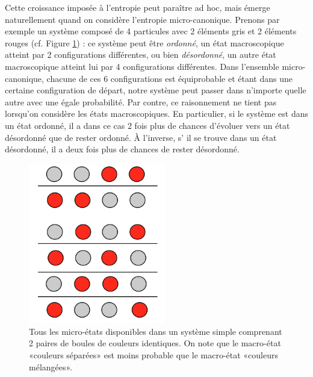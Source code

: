 Cette croissance imposée à l'entropie peut paraître ad hoc, mais émerge naturellement quand on considère l'entropie micro-canonique. Prenons par exemple un système composé de 4 particules avec 2 éléments gris et 2 éléments rouges (cf. Figure \ref{f:micro}) : ce système peut être \textit{ordonné}, un état macroscopique atteint par 2 configurations différentes, ou bien \textit{désordonné}, un autre état macroscopique atteint lui par 4 configurations différentes. Dans l'ensemble micro-canonique, chacune de ces 6 configurations est équiprobable et étant dans une certaine configuration de départ, notre système peut passer dans n'importe quelle autre avec une égale probabilité. Par contre, ce raisonnement ne tient pas lorsqu'on considère les états macroscopiques.
En particulier, si le système est dans un état ordonné, il a dans ce cas 2 fois plus de chances d'évoluer vers un état désordonné que de rester ordonné.  À l'inverse, s’ il se trouve dans un état désordonné, il a deux fois plus de chances de rester désordonné.
\begin{figure}[htbp]
	\centering
		\includegraphics[height=7cm]{figs/micro.png}
	\caption[micro-états disponibles dans un système simple comprenant 2 paires de boules de couleurs identiques]{Tous les micro-états disponibles dans un système simple comprenant 2 paires de boules de couleurs identiques. On note que le macro-état «couleurs séparées» est moins probable que le macro-état «couleurs mélangées».}
	\label{f:micro}
\end{figure}

